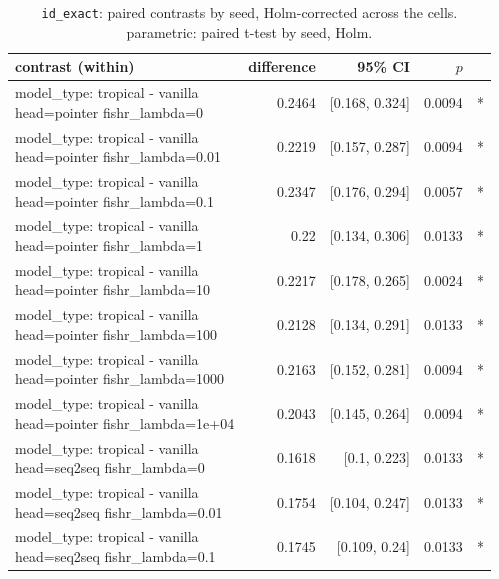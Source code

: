 \documentclass[10pt]{article}
\makeatletter
\newcommand{\stackcell}[1]{\begin{tabular}[t]{@{}l@{}}#1\end{tabular}}
\makeatother
\begin{document}
{\small
\begin{longtable}{lrrrl}
\caption{\texttt{id\_exact}: paired contrasts by seed, Holm-corrected across the cells. parametric: paired t-test by seed, Holm.}\label{tab:paired-id_exact}\\
\toprule
contrast (within) & difference & 95\% CI & $p$ & \\
\midrule
\endhead
\stackcell{model\_type: tropical - vanilla\\\footnotesize head=pointer fishr\_lambda=0 } & 0.2464 & [0.168, 0.324] & 0.0094 & *\\
\stackcell{model\_type: tropical - vanilla\\\footnotesize head=pointer fishr\_lambda=0.01 } & 0.2219 & [0.157, 0.287] & 0.0094 & *\\
\stackcell{model\_type: tropical - vanilla\\\footnotesize head=pointer fishr\_lambda=0.1 } & 0.2347 & [0.176, 0.294] & 0.0057 & *\\
\stackcell{model\_type: tropical - vanilla\\\footnotesize head=pointer fishr\_lambda=1 } & 0.22 & [0.134, 0.306] & 0.0133 & *\\
\stackcell{model\_type: tropical - vanilla\\\footnotesize head=pointer fishr\_lambda=10 } & 0.2217 & [0.178, 0.265] & 0.0024 & *\\
\stackcell{model\_type: tropical - vanilla\\\footnotesize head=pointer fishr\_lambda=100 } & 0.2128 & [0.134, 0.291] & 0.0133 & *\\
\stackcell{model\_type: tropical - vanilla\\\footnotesize head=pointer fishr\_lambda=1000 } & 0.2163 & [0.152, 0.281] & 0.0094 & *\\
\stackcell{model\_type: tropical - vanilla\\\footnotesize head=pointer fishr\_lambda=1e+04 } & 0.2043 & [0.145, 0.264] & 0.0094 & *\\
\stackcell{model\_type: tropical - vanilla\\\footnotesize head=seq2seq fishr\_lambda=0 } & 0.1618 & [0.1, 0.223] & 0.0133 & *\\
\stackcell{model\_type: tropical - vanilla\\\footnotesize head=seq2seq fishr\_lambda=0.01 } & 0.1754 & [0.104, 0.247] & 0.0133 & *\\
\stackcell{model\_type: tropical - vanilla\\\footnotesize head=seq2seq fishr\_lambda=0.1 } & 0.1745 & [0.109, 0.24] & 0.0133 & *\\

\end{longtable}}
\end{document}
